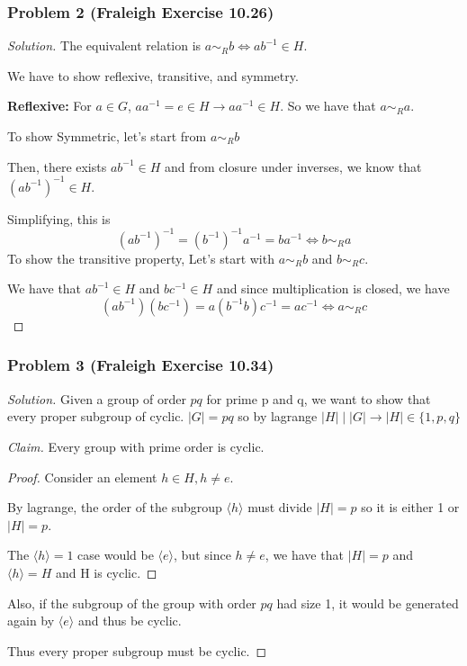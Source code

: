 \documentclass[11pt]{article}
\newcommand{\1}{\mathbf{1}}
\theoremstyle{definition}
\newenvironment{solution}{\begin{proof}[Solution]}{\end{proof}}
\begin{document}
\subsubsection*{Problem 2 (Fraleigh Exercise 10.26)}
\begin{solution}
    The equivalent relation is \(a \sim_R b \iff ab^{-1} \in H.\)
    \par We have to show reflexive, transitive, and symmetry.
    \par \textbf{Reflexive: } For \(a \in G\), \(aa^{-1} = e \in H \rightarrow aa^{-1} \in
    H.\)
    So we have that \(a \sim_R a.\)
\par    To show Symmetric, let's start from \(a\sim_R b\)
\par Then, there exists \(ab^{-1} \in H\) and from closure under inverses, we know that
\((ab^{-1})^{-1} \in H.\) \par Simplifying, this is  
\[(ab^{-1})^{-1} = (b^{-1})^{-1} a^{-1} = ba^{-1} \iff b \sim_R a\]
To show the transitive property, Let's start with \(a\sim_R b\) and \(b\sim_R c.\)
\par We have that \(ab^{-1} \in H\) and \(bc^{-1} \in H\) and since multiplication is closed,
we have \[(ab^{-1} )(bc^{-1}) = a(b^{-1}b)c^{-1} = ac^{-1} \iff a\sim_R c\]
\end{solution}
\subsubsection*{Problem 3 (Fraleigh Exercise 10.34)}
\begin{solution}
    Given a group of order \(pq\) for prime p and q, we want to show that every proper
    subgroup of cyclic.
    \(|G| = pq\) so by lagrange   \(|H| \mid |G| \rightarrow |H| \in \{1, p, q\}\)
    \par \noindent\textit{Claim.} Every group with prime order is cyclic.
    \begin{proof}
        Consider an element \(h\in H, h\ne e.\)
        \par  By lagrange, the order of the subgroup \(\langle h \rangle\) must divide
    \(|H|= p\) so it is either 1 or \(|H|= p.\) 
    \par The \(\langle h\rangle = 1\) case would be \(\langle e\rangle
    \), but since \(h \ne e\), we have that  \(|H| = p\) and \(
    \langle h\rangle = H \) and H is cyclic.
    \end{proof}
    Also, if the subgroup of the group with order \(pq\) had size 1, it would be generated
    again by \(\langle e\rangle\) and thus be cyclic.
\par     Thus every proper subgroup must be cyclic.
\end{solution}
\end{document}
